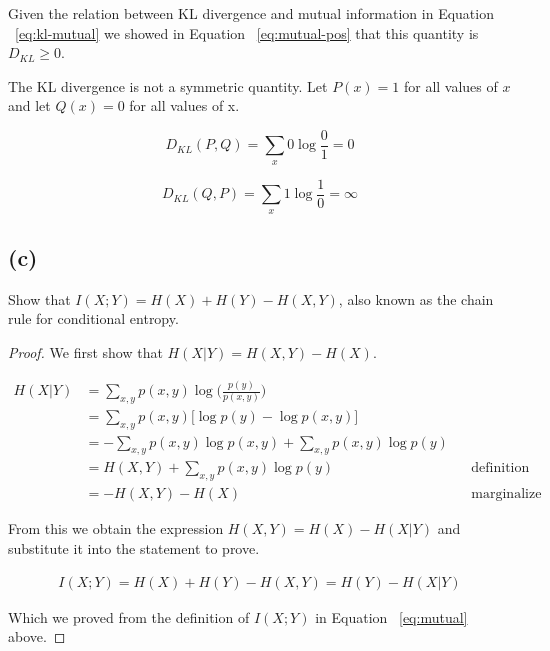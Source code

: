 \documentclass[11pt]{amsart}
\begin{document}
Given the relation between KL divergence and mutual information in Equation ~\ref{eq:kl-mutual} we showed in Equation ~\ref{eq:mutual-pos} that this quantity is $D_{KL} \geq 0$. 

The KL divergence is not a symmetric quantity. Let $P(x) = 1$ for all values of $x$ and let $Q(x) = 0	$ for all values of x. 

\begin{equation}
D_{KL}(P, Q) = \sum_{x}0 \log \frac{0}{1} = 0
\end{equation}

\begin{equation}
D_{KL}(Q,P) = \sum_{x}1 \log \frac{1}{0} = \infty
\end{equation}


\subsection{(c)}

Show that $I(X;Y) = H(X) + H(Y) - H(X,Y)$, also known as the chain rule for conditional entropy.

\begin{proof}

We first show that $H(X \vert Y) = H(X,Y) - H(X)$.

\begin{equation}
\begin{aligned}
H(X\vert Y) &= \sum_{x,y}p(x,y) \log \bigg( \frac{p(y)}{p(x,y)} \bigg) \\
		 &= \sum_{x,y} p(x,y) \bigg[\log p(y) - \log p(x,y) \bigg] \\
		 &= -\sum_{x,y}p(x,y) \log p(x,y) + \sum_{x,y} p(x,y) \log p(y) \\
		 &= H(X,Y) + \sum_{x,y} p(x,y) \log p(y) && \text{definition of entropy}\\
		 &= -H(X,Y) - H(X) 				      &&\text{marginalize out x as before}
\end{aligned}
\end{equation}

From this we obtain the expression $H(X,Y) = H(X) - H(X \vert Y)$ and substitute it into the statement to prove.

\begin{equation}
\begin{aligned}
I(X;Y) = H(X) + H(Y) - H(X,Y) = H(Y) - H(X \vert Y)
\end{aligned}
\end{equation}

Which we proved from the definition of $I(X;Y)$ in Equation ~\ref{eq:mutual} above.

\end{proof}
\end{document}
